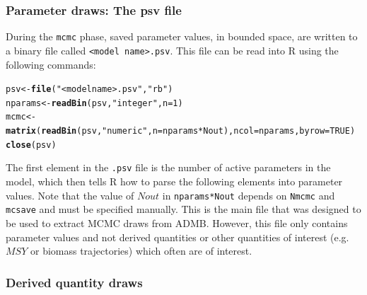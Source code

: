 \documentclass{article}\usepackage[]{graphicx}\usepackage[]{color}
\makeatletter
\newcommand{\hlnum}[1]{\textcolor[rgb]{0.686,0.059,0.569}{#1}}%
\newcommand{\hlstr}[1]{\textcolor[rgb]{0.192,0.494,0.8}{#1}}%
\newcommand{\hlopt}[1]{\textcolor[rgb]{0,0,0}{#1}}%
\newcommand{\hlstd}[1]{\textcolor[rgb]{0.345,0.345,0.345}{#1}}%
\newcommand{\hlkwb}[1]{\textcolor[rgb]{0.69,0.353,0.396}{#1}}%
\newcommand{\hlkwc}[1]{\textcolor[rgb]{0.333,0.667,0.333}{#1}}%
\newcommand{\hlkwd}[1]{\textcolor[rgb]{0.737,0.353,0.396}{\textbf{#1}}}%
\newenvironment{kframe}{%
 \def\at@end@of@kframe{}%
 \ifinner\ifhmode%
  \def\at@end@of@kframe{\end{minipage}}%
  \begin{minipage}{\columnwidth}%
 \fi\fi%
 \def\FrameCommand##1{\hskip\@totalleftmargin \hskip-\fboxsep
 \colorbox{shadecolor}{##1}\hskip-\fboxsep
     \hskip-\linewidth \hskip-\@totalleftmargin \hskip\columnwidth}%
 \MakeFramed {\advance\hsize-\width
   \@totalleftmargin\z@ \linewidth\hsize
   \@setminipage}}%
 {\par\unskip\endMakeFramed%
 \at@end@of@kframe}
\newenvironment{knitrout}{}{} %
\makeatother
\begin{document}
\subsubsection{Parameter draws: The psv file}
During the \texttt{mcmc} phase, saved parameter values, in
bounded space, are written to a binary file called
\texttt{<model name>.psv}. This file can be read into R
using the following commands:
\begin{knitrout}
\color{fgcolor}\begin{kframe}
\begin{alltt}
\hlstd{psv} \hlkwb{<-} \hlkwd{file}\hlstd{(}\hlstr{"<model name>.psv"}\hlstd{,} \hlstr{"rb"}\hlstd{)}
\hlstd{nparams} \hlkwb{<-} \hlkwd{readBin}\hlstd{(psv,} \hlstr{"integer"}\hlstd{,} \hlkwc{n}\hlstd{=}\hlnum{1}\hlstd{)}
\hlstd{mcmc} \hlkwb{<-} \hlkwd{matrix}\hlstd{(}\hlkwd{readBin}\hlstd{(psv,} \hlstr{"numeric"}\hlstd{,} \hlkwc{n}\hlstd{=nparams}\hlopt{*}\hlstd{Nout),} \hlkwc{ncol}\hlstd{=nparams,} \hlkwc{byrow}\hlstd{=}\hlnum{TRUE}\hlstd{)}
\hlkwd{close}\hlstd{(psv)}
\end{alltt}
\end{kframe}
\end{knitrout}
The first element in the \texttt{.psv} file is the number of
active parameters in the model, which then tells R how to
parse the following elements into parameter values. Note
that the value of $Nout$ in \texttt{nparams*Nout} depends on
\texttt{Nmcmc} and \texttt{mcsave} and must be specified
manually. This is the main file that was designed to be used
to extract MCMC draws from ADMB. However, this file only
contains parameter values and not derived quantities or
other quantities of interest (e.g. $MSY$ or biomass
trajectories) which often are of interest.
\subsubsection{Derived quantity draws}
\end{document}
